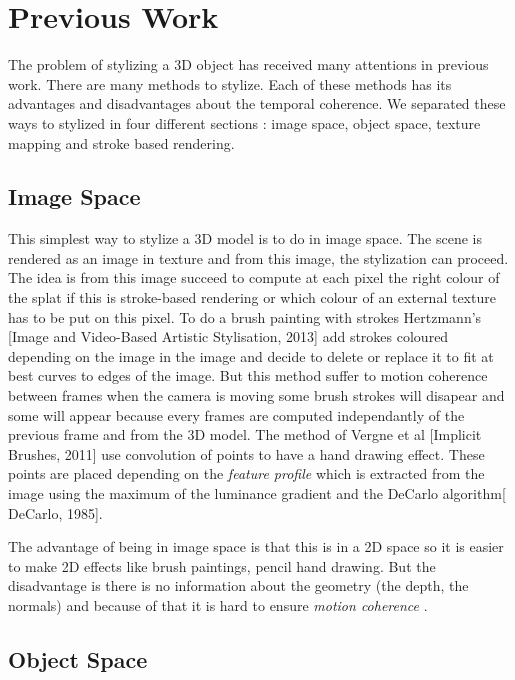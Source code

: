 \chapter{Previous Work}



The problem of stylizing a 3D object has received many attentions in previous work. There are many methods to stylize. Each of these methods has its advantages and disadvantages about the temporal coherence. We separated these ways to stylized in four different sections : image space, object space, texture mapping and stroke based rendering.


\section{Image Space}

This simplest way to stylize a 3D model is to do in image space. The scene is rendered as an image in texture and from this image, the stylization can proceed. The idea is from this image succeed to compute at each pixel the right colour of the splat if this is stroke-based rendering or which colour of an external texture has to be put on this pixel. To do a brush painting with strokes Hertzmann's [Image and Video-Based Artistic Stylisation, 2013] add strokes coloured depending on the image in the image and decide to delete or replace it to fit at best curves to edges of the image. But this method suffer to motion coherence between frames when the camera is moving some brush strokes will disapear and some will appear because every frames are computed independantly of the previous frame and from the 3D model. The method of Vergne et al [Implicit Brushes, 2011] use convolution of points to have a hand drawing effect. These points are placed depending on the \textit{feature profile} which is extracted from the image using the maximum of the luminance gradient and the DeCarlo algorithm[ DeCarlo, 1985].

The advantage of being in image space is that this is in a 2D space so it is easier to make 2D effects like brush paintings, pencil hand drawing. But the disadvantage is there is no information about the geometry (the depth, the normals) and because of that it is hard to ensure \textit{motion coherence} \cite{perlin}.

\section{Object Space}

